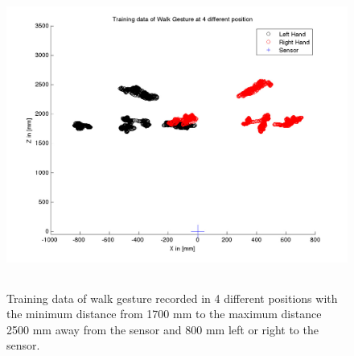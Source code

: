 \begin{figure}
	[h] \centering 
	\includegraphics[height=10cm]{figures/result/train-walk-all.jpg} \caption{Training data of walk gesture recorded in 4 different positions with the minimum distance from 1700 mm to the maximum distance 2500 mm away from the sensor and 800 mm left or right to the sensor.} 
	\label{fg:ges:pos} 
\end{figure}

